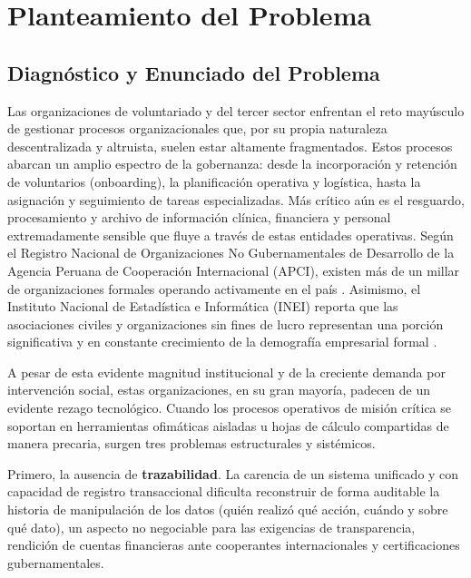 \documentclass[11pt,a4paper,oneside]{report}
\begin{document}


\chapter{Planteamiento del Problema}

\section{Diagn\'ostico y Enunciado del Problema}

Las organizaciones de voluntariado y del tercer sector enfrentan el reto may\'usculo de gestionar procesos organizacionales que, por su propia naturaleza descentralizada y altruista, suelen estar altamente fragmentados. Estos procesos abarcan un amplio espectro de la gobernanza: desde la incorporaci\'on y retenci\'on de voluntarios (onboarding), la planificaci\'on operativa y log\'istica, hasta la asignaci\'on y seguimiento de tareas especializadas. M\'as cr\'itico a\'un es el resguardo, procesamiento y archivo de informaci\'on cl\'inica, financiera y personal extremadamente sensible que fluye a trav\'es de estas entidades operativas. Seg\'un el Registro Nacional de Organizaciones No Gubernamentales de Desarrollo de la Agencia Peruana de Cooperaci\'on Internacional (APCI), existen m\'as de un millar de organizaciones formales operando activamente en el pa\'is \citep{apci2024}. Asimismo, el Instituto Nacional de Estad\'istica e Inform\'atica (INEI) reporta que las asociaciones civiles y organizaciones sin fines de lucro representan una porci\'on significativa y en constante crecimiento de la demograf\'ia empresarial formal \citep{inei2024}. 

A pesar de esta evidente magnitud institucional y de la creciente demanda por intervenci\'on social, estas organizaciones, en su gran mayor\'ia, padecen de un evidente rezago tecnol\'ogico. Cuando los procesos operativos de misión crítica se soportan en herramientas ofim\'aticas aisladas u hojas de c\'alculo compartidas de manera precaria, surgen tres problemas estructurales y sist\'emicos. 

Primero, la ausencia de \textbf{trazabilidad}. La carencia de un sistema unificado y con capacidad de registro transaccional dificulta reconstruir de forma auditable la historia de manipulaci\'on de los datos (qui\'en realiz\'o qu\'e acci\'on, cu\'ando y sobre qu\'e dato), un aspecto no negociable para las exigencias de transparencia, rendici\'on de cuentas financieras ante cooperantes internacionales y certificaciones gubernamentales. 
\end{document}
